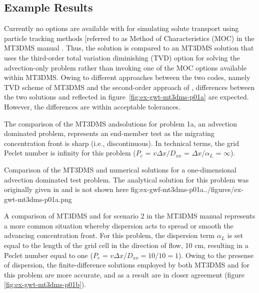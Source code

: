 

\subsection{Example Results}

Currently no options are available with \mf for simulating solute transport using particle tracking methods [referred to as Method of Characteristics (MOC) in the MT3DMS manual \cite{zheng1999mt3dms}.  Thus, the \mf solution is compared to an MT3DMS solution that uses the third-order total variation diminishing (TVD) option for solving the advection-only problem rather than invoking one of the MOC options available within MT3DMS.  Owing to different approaches between the two codes, namely TVD scheme of  MT3DMS and the second-order approach of \mf, differences between the two solutions and reflected in figure~\ref{fig:ex-gwt-mt3dms-p01a} are expected.  However, the differences are within acceptable tolerances.

The comparison of the MT3DMS and\mf solutions for problem 1a, an advection dominated problem, represents an end-member test as the migrating concentration front is sharp (i.e., discontinuous). In technical terms, the grid Peclet number is infinity for this problem ($P_e$ = $v\Delta x/D_{xx}$ = $\Delta x$/$\alpha_L$ = $\infty$).

\begin{StandardFigure}
	{Comparison of the MT3DMS and \mf numerical solutions for a one-dimensional advection dominated test problem.  The analytical solution for this problem was originally given in \cite{vanGenuchtenAlves1982} and is not shown here}
	{fig:ex-gwf-mt3dms-p01a}{../figures/ex-gwt-mt3dms-p01a.png}
\end{StandardFigure}

A comparison of MT3DMS and \mf for scenario 2 in the MT3DMS manual represents a more common situation whereby dispersion acts to spread or smooth the advancing concentration front.  For this problem, the dispersion term $\alpha_L$ is set equal to the length of the grid cell in the direction of flow, 10 cm, resulting in a Peclet number equal to one ($P_e$ = $v\Delta x/D_{xx} = 10/10 = 1$).  Owing to the presense of dispersion, the finite-difference solutions employed by both MT3DMS and \mf for this problem are more accurate, and as a result are in closer agreement (figure \ref{fig:ex-gwt-mt3dms-p01b}).

